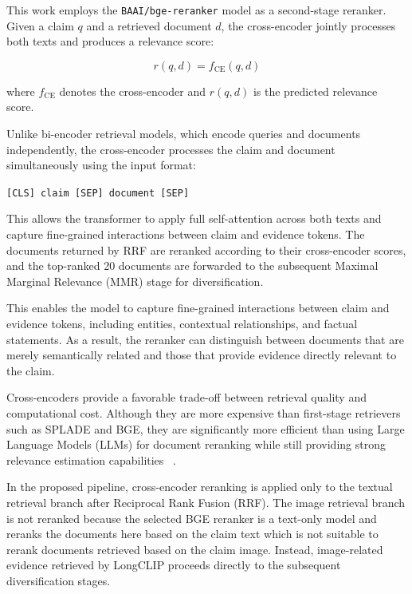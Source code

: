 This work employs the \texttt{BAAI/bge-reranker} model as a second-stage reranker. Given a claim $q$ and a retrieved document $d$, the cross-encoder jointly processes both texts and produces a relevance score:

\begin{equation}
r(q,d) = f_{\text{CE}}(q,d)
\label{eq}
\end{equation}

where $f_{\text{CE}}$ denotes the cross-encoder and $r(q,d)$ is the predicted relevance score.

Unlike bi-encoder retrieval models, which encode queries and documents independently, the cross-encoder processes the claim and document simultaneously using the input format:

\begin{center}
\texttt{[CLS] claim [SEP] document [SEP]}
\end{center}

This allows the transformer to apply full self-attention across both texts and capture fine-grained interactions between claim and evidence tokens. The documents returned by RRF are reranked according to their cross-encoder scores, and the top-ranked 20 documents are forwarded to the subsequent Maximal Marginal Relevance (MMR) stage for diversification.

This enables the model to capture fine-grained interactions between claim and evidence tokens, including entities, contextual relationships, and factual statements. As a result, the reranker can distinguish between documents that are merely semantically related and those that provide evidence directly relevant to the claim.

Cross-encoders provide a favorable trade-off between retrieval quality and computational cost. Although they are more expensive than first-stage retrievers such as SPLADE and BGE, they are significantly more efficient than using Large Language Models (LLMs) for document reranking while still providing strong relevance estimation capabilities ~\cite{Dejean2024Mar}.

In the proposed pipeline, cross-encoder reranking is applied only to the textual retrieval branch after Reciprocal Rank Fusion (RRF). The image retrieval branch is not reranked because the selected BGE reranker is a text-only model and reranks the documents here based on the claim text which is not suitable to rerank documents retrieved based on the claim image. Instead, image-related evidence retrieved by LongCLIP proceeds directly to the subsequent diversification stages.

